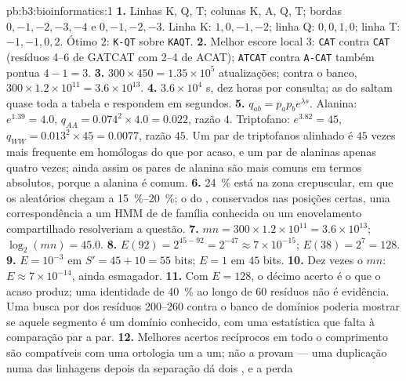\begin{solution}{pb:b3:bioinformatics:1}
\textbf{1.} Linhas K, Q, T; colunas K, A, Q, T; bordas $0,-1,-2,-3,-4$
e $0,-1,-2,-3$. Linha K: $1, 0, -1, -2$; linha Q: $0, 0, 1, 0$; linha
T: $-1, -1, 0, 2$. Ótimo $2$: \texttt{K-QT} sobre \texttt{KAQT}.
\textbf{2.} Melhor escore local $3$: \texttt{CAT} contra \texttt{CAT}
(resíduos 4--6 de GATCAT com 2--4 de ACAT); \texttt{ATCAT} contra
\texttt{A-CAT} também pontua $4 - 1 = 3$.
\textbf{3.} $300\times 450 = 1.35\times 10^{5}$ atualizações; contra o
banco, $300\times 1.2\times 10^{11} = 3.6\times 10^{13}$.
\textbf{4.} $3.6\times 10^{4}$ s, dez horas por consulta; as 
do  saltam quase toda a tabela e respondem em segundos.
\textbf{5.} $q_{ab} = p_{a}p_{b}e^{\lambda s}$. Alanina: $e^{1.39} = 4.0$,
$q_{AA} = 0.074^{2}\times 4.0 = 0.022$, razão $4$. Triptofano:
$e^{3.82} = 45$, $q_{WW} = 0.013^{2}\times 45 = 0.0077$, razão $45$. Um
par de triptofanos alinhado é $45$ vezes mais frequente em homólogas do
que por acaso, e um par de alaninas apenas quatro vezes; ainda assim os
pares de alanina são mais comuns em termos absolutos, porque a alanina
é comum.
\textbf{6.} \qty{24}{\%} está na zona crepuscular, em que os
 aleatórios chegam a \qtyrange{15}{20}{\%}; o  do
,  conservados nas posições certas, uma
correspondência a um HMM de  de família conhecida ou um
enovelamento compartilhado resolveriam a questão.
\textbf{7.} $mn = 300\times 1.2\times 10^{11} = 3.6\times 10^{13}$;
$\log_{2}(mn) = 45.0$.
\textbf{8.} $E(92) = 2^{45 - 92} = 2^{-47} \approx 7\times 10^{-15}$;
$E(38) = 2^{7} = 128$.
\textbf{9.} $E = 10^{-3}$ em $S' = 45 + 10 = 55$ bits; $E = 1$ em $45$
bits.
\textbf{10.} Dez vezes o $mn$: $E \approx 7\times 10^{-14}$, ainda
esmagador.
\textbf{11.} Com $E = 128$, o décimo acerto é o que o acaso produz; uma
identidade de \qty{40}{\%} ao longo de $60$ resíduos não é evidência.
Uma busca por  dos resíduos 200--260 contra o banco de domínios
poderia mostrar se aquele segmento é um domínio conhecido, com uma
estatística que falta à comparação par a par.
\textbf{12.} Melhores acertos recíprocos em todo o comprimento são
compatíveis com uma ortologia um a um; não a provam --- uma duplicação
numa das linhagens depois da separação dá dois , e a perda

\end{solution}
